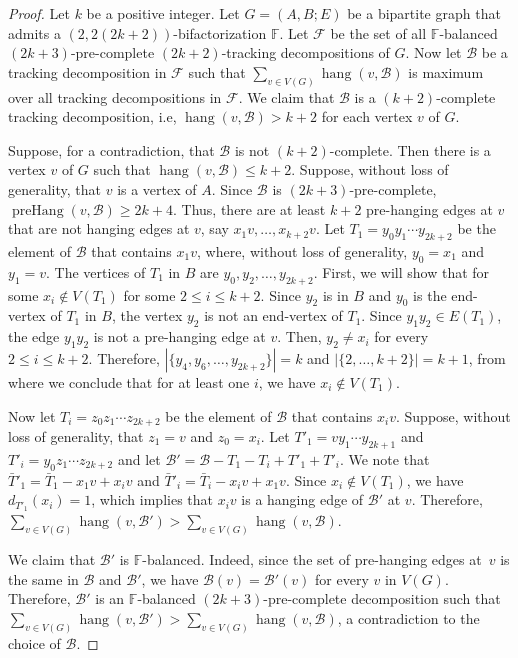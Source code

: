\documentclass[12pt,reqno,a4paper]{amsart}
\DeclareMathOperator{\prehang}{preHang}
\DeclareMathOperator{\hang}{hang}
\newcommand{\B}{\mathcal{B}}
\begin{document}
\begin{proof}
	Let \(k\) be a positive integer.
	Let \(G = (A,B;E)\) be a bipartite graph that admits a 
	\((2,2(2k+2))\)-bifactorization \(\mathbb{F}\).
	Let $\mathcal{F}$ be the set of all \(\mathbb{F}\)-balanced 
	\((2k+3)\)-pre-complete $(2k+2)$-tracking decompositions of $G$. 
	Now let \(\B\) be a tracking decomposition in $\mathcal{F}$ 
	such that  \(\sum_{v\in V(G)} \hang(v,\B)\) is maximum over all 
	tracking decompositions in $\mathcal{F}$.
	We claim that \(\B\) is a \((k+2)\)-complete tracking decomposition,
	i.e, \(\hang(v,\B) > k+2\) for each vertex \(v\) of \(G\).
	
	Suppose, for a contradiction, that \(\B\) is not \((k+2)\)-complete.
	Then there is a vertex \(v\) of \(G\) such that \(\hang(v,\B) \leq k+2\).
	Suppose, without loss of generality, that \(v\) is a vertex of \(A\).
	Since \(\B\) is \((2k+3)\)-pre-complete, \(\prehang(v,\B) \geq 2k+4\).
	Thus, there are at least \(k+2\) pre-hanging edges at \(v\) 
	that are not hanging edges at \(v\), say \(x_1v,\ldots,x_{k+2}v\).
	Let \(T_1 = y_0y_1\cdots y_{2k+2}\) be the element of \(\B\) that contains \(x_1v\),
	where, without loss of generality, \(y_0 = x_1\) and \(y_1 = v\).
	The vertices of \(T_1\) in \(B\) are \(y_0,y_2,\ldots, y_{2k+2}\).
	First, we will show that for some $x_i\notin V(T_1)$ for some \(2\leq i \leq k+2\). 
	Since \(y_2\) is in \(B\) and \(y_0\) is the end-vertex of \(T_1\) in \(B\), 
	the vertex \(y_2\) is not an end-vertex of \(T_1\). 
	Since \(y_1y_2 \in E(T_1)\), the edge \(y_1y_2\) is not a pre-hanging edge at \(v\).
	Then, \(y_2 \neq x_i\) for every \(2\leq i\leq k+2\). 
	Therefore, \(|\{y_4, y_6,\ldots,y_{2k+2}\}| = k\) and \(|\{2,\ldots,k+2\}| = k+1\), 
	from where we conclude that for at least one \(i\), we have \(x_i \notin V(T_1)\).
	
	Now let \(T_i = z_0z_1\cdots z_{2k+2}\) be the element of \(\B\) that contains \(x_iv\).
	Suppose, without loss of generality, that \(z_1 = v\) and \(z_0 = x_i\).
	Let \(T'_1 = vy_1\cdots y_{2k+1}\) and \(T'_i = y_0 z_1\cdots z_{2k+2}\)
	and let \(\B' = \B - T_1 - T_i + T'_1 + T'_i\).
	We note that \(\bar T'_1 = \bar T_1 - x_1v + x_iv\) and \(\bar T'_i = \bar T_i -x_iv + x_1v\).
	Since \(x_i \notin V(T_1)\), we have \(d_{T'_1}(x_i) = 1\), which 
implies that \(x_iv\) is a hanging edge of \(\B'\) at \(v\).
	Therefore, \(\sum_{v\in V(G)} \hang(v,\B') > 
			\sum_{v\in V(G)} \hang(v,\B)\).
			
	We claim that \(\B'\) is \(\mathbb{F}\)-balanced.
	Indeed, since the set of pre-hanging edges at~\(v\) is the same in 
\(\B\) and \(\B'\),
	we have \(\B(v) = \B'(v)\) for every \(v\) in \(V(G)\).
	Therefore, \(\B'\) is an \(\mathbb{F}\)-balanced 
\((2k+3)\)-pre-complete
	decomposition such that 
	\(\sum_{v\in V(G)} \hang(v,\B') > 
			\sum_{v\in V(G)} \hang(v,\B)\),
	a contradiction to the choice of \(\B\).
\end{proof}
\end{document}
